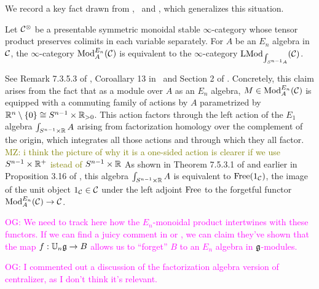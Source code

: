 \documentclass[11pt]{amsart}
\numberwithin{equation}{section}
\def\owen{\textcolor{magenta}{OG: }\textcolor{magenta}}
\def\mahmoud{\textcolor{olive}{MZ: }\textcolor{olive}}
\begin{document}
We record a key fact drawn from \cite{LurieHA},~\cite{FrancisHH}  and \cite{GG-Notes}, which generalizes this situation.

\begin{prp}
\label{P:ModentoModSn}
Let $\mathcal C^\otimes$ be a presentable symmetric monoidal stable $\infty$-category whose tensor product preserves colimits in each variable separately.
For $A$ be an $E_n$ algebra in $\mathcal C$,
the $\infty$-category ${\rm Mod}^{E_n}_A(\mathcal C)$ is equivalent to the $\infty$-category ${\rm LMod}_{\int_{S^{n-1} A}}(\mathcal C)$.
\end{prp}

See Remark 7.3.5.3 of \cite{LurieHA}, Coroallary 13 in~\cite{GG-Notes} and Section 2 of \cite{FrancisHH}.
Concretely, this claim arises from the fact that as a module over $A$ as an $E_n$ algebra, 
$M \in {\rm Mod}^{E_n}_A(\mathcal C)$ is equipped with a commuting family of actions by $A$ parametrized by $\mathbb R^n \setminus \{0\}\cong S^{n-1} \times \mathbb R_{>0}$.
This action factors through the left action of the $E_1$ algebra $\int_{S^{n-1} \times \mathbb R} A$ arising from factorization homology over the complement of the origin,
which integrates all those actions and through which they all factor. \mahmoud{i think the picture of why it is a one-sided action is clearer if we use $S^{n-1} \times \mathbb R^+$ istead of $S^{n-1} \times \mathbb R$}
As shown in Theorem 7.5.3.1 of \cite{LurieHA} and earlier in Proposition 3.16 of \cite{FrancisHH}, 
this algebra $\int_{S^{n-1} \times \mathbb R} A$ is equivalent to ${\rm Free}(1_\mathcal C)$, 
the image of the unit object $1_\mathcal C \in \mathcal C$ under the left adjoint ${\rm Free}$ to the forgetful functor ${\rm Mod}^{E_n}_A(\mathcal C) \to \mathcal C$.

\owen{We need to track here how the $E_n$-monoidal product intertwines with these functors.
If we can find a juicy comment in \cite{LurieHA} or \cite{FrancisHH}, 
we can claim they've shown that the map $f: \mathbb U_n \mathfrak g \to B$ allows us to ``forget'' $B$ to an $E_n$ algebra in $\mathfrak g$-modules.}

\owen{I commented out a discussion of the factorization algebra version of centralizer, as I don't think it's relevant.}
\end{document}
